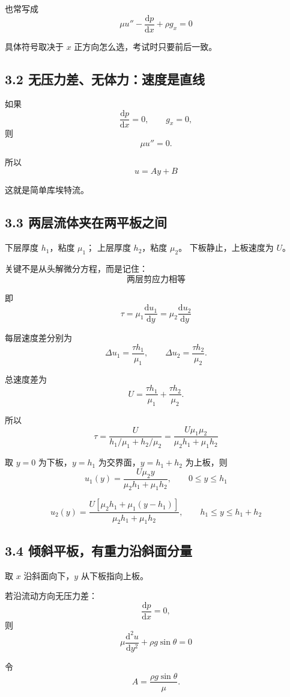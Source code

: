 \documentclass[12pt,a4paper]{ctexart}
\newcommand{\dd}{\mathrm d}
\begin{document}
也常写成
\[
\boxed{
\mu u''-\frac{\dd p}{\dd x}+\rho g_x=0
}
\]

具体符号取决于 \(x\) 正方向怎么选，考试时只要前后一致。

\subsection*{3.2 无压力差、无体力：速度是直线}

如果
\[
\frac{\dd p}{\dd x}=0,\qquad g_x=0,
\]
则
\[
\mu u''=0.
\]

所以
\[
\boxed{
u=Ay+B
}
\]

这就是简单库埃特流。

\subsection*{3.3 两层流体夹在两平板之间}

下层厚度 \(h_1\)，粘度 \(\mu_1\)；
上层厚度 \(h_2\)，粘度 \(\mu_2\)。
下板静止，上板速度为 \(U\)。

关键不是从头解微分方程，而是记住：
\[
\boxed{
\text{两层剪应力相等}
}
\]

即
\[
\boxed{
\tau=\mu_1\frac{\dd u_1}{\dd y}
=\mu_2\frac{\dd u_2}{\dd y}
}
\]

每层速度差分别为
\[
\Delta u_1=\frac{\tau h_1}{\mu_1},
\qquad
\Delta u_2=\frac{\tau h_2}{\mu_2}.
\]

总速度差为
\[
U=\frac{\tau h_1}{\mu_1}+\frac{\tau h_2}{\mu_2}.
\]

所以
\[
\boxed{
\tau=
\frac{U}{h_1/\mu_1+h_2/\mu_2}
=
\frac{U\mu_1\mu_2}{\mu_2h_1+\mu_1h_2}
}
\]

取 \(y=0\) 为下板，\(y=h_1\) 为交界面，\(y=h_1+h_2\) 为上板，则
\[
\boxed{
u_1(y)=\frac{U\mu_2y}{\mu_2h_1+\mu_1h_2},
\qquad 0\le y\le h_1
}
\]

\[
\boxed{
u_2(y)=
\frac{U\left[\mu_2h_1+\mu_1(y-h_1)\right]}
{\mu_2h_1+\mu_1h_2},
\qquad h_1\le y\le h_1+h_2
}
\]

\subsection*{3.4 倾斜平板，有重力沿斜面分量}

取 \(x\) 沿斜面向下，\(y\) 从下板指向上板。

若沿流动方向无压力差：
\[
\frac{\dd p}{\dd x}=0,
\]
则
\[
\boxed{
\mu\frac{\dd^2u}{\dd y^2}+\rho g\sin\theta=0
}
\]

令
\[
A=\frac{\rho g\sin\theta}{\mu}.
\]
\end{document}

